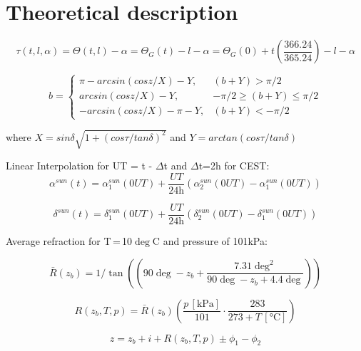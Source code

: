
\chapter{Theoretical description}
\label{chap:fvz}

\begin{equation}
    \tau (t, l, \alpha)= \Theta (t, l) - \alpha = \Theta_G(t) - l - \alpha = \Theta_G(0) + t  \left( \frac{366.24}{365.24}\right) - l - \alpha
\end{equation}

\[
b = 
\begin{cases}
    \pi - arcsin(cos z/X) - Y, & (b + Y ) > \pi/2 \\
    arcsin(cos z/X) - Y, & -\pi/2 \ge (b + Y ) \le \pi/2 \\
    -arcsin(cos z/X) - \pi - Y, & (b + Y ) < - \pi/2
\end{cases}
\]

where $X = sin \delta \sqrt{1+(cos \tau / tan \delta)^2}$ and $Y = arctan(cos \tau / tan \delta)$

Linear Interpolation for UT = t - $\Delta$t and $\Delta$t=2h for CEST:
\begin{equation}
    \alpha^{sun}(t) = \alpha^{sun}_1(0UT) + \frac{UT}{\text{24h}}(\alpha^{sun}_2(0UT)-\alpha^{sun}_1(0UT))
\end{equation}

\begin{equation}
    \delta^{sun}(t) = \delta^{sun}_1(0UT) + \frac{UT}{\text{24h}}(\delta^{sun}_2(0UT)-\delta^{sun}_1(0UT))
\end{equation}

Average refraction for T\,=\,10$\deg$C and pressure of 101kPa:

\begin{equation}
    \bar{R}(z_b) = 1/\tan((90 \deg - z_b + \frac{7.31 \deg^2}{90\deg - z_b + 4.4 \deg}))
\end{equation}

\begin{equation}
    R(z_b, T, p) = \bar{R}(z_b) \left( \frac{p\, [\si{\kPa}]}{101} \cdot \frac{283}{273 + T\, [\si{\celsius}]} \right)
\end{equation}

\begin{equation}
    \boxed{
        z = z_b + i + R(z_b, T, p) \pm \phi_1
- \phi_2    }
\end{equation}